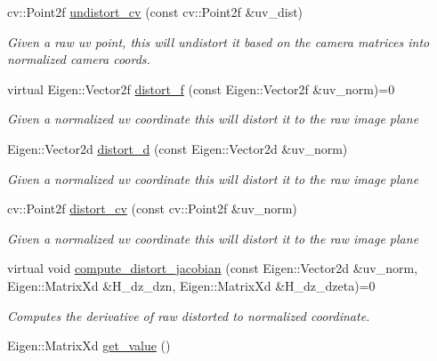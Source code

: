 \begin{DoxyCompactItemize}
cv\+::\+Point2f \hyperlink{classov__core_1_1CamBase_a42b140a7dfc1398cc7fc2f8df6c141d2}{undistort\+\_\+cv} (const cv\+::\+Point2f \&uv\+\_\+dist)
\begin{DoxyCompactList}\small\item\em Given a raw uv point, this will undistort it based on the camera matrices into normalized camera coords. \end{DoxyCompactList}\item 
virtual Eigen\+::\+Vector2f \hyperlink{classov__core_1_1CamBase_a00902793219107474dc21f762fb14556}{distort\+\_\+f} (const Eigen\+::\+Vector2f \&uv\+\_\+norm)=0
\begin{DoxyCompactList}\small\item\em Given a normalized uv coordinate this will distort it to the raw image plane \end{DoxyCompactList}\item 
Eigen\+::\+Vector2d \hyperlink{classov__core_1_1CamBase_acf981dbc008c5929bf32ddde80b04caf}{distort\+\_\+d} (const Eigen\+::\+Vector2d \&uv\+\_\+norm)
\begin{DoxyCompactList}\small\item\em Given a normalized uv coordinate this will distort it to the raw image plane \end{DoxyCompactList}\item 
cv\+::\+Point2f \hyperlink{classov__core_1_1CamBase_ae04e8fb6f5b61a7c9e9b7c22cfc1b82c}{distort\+\_\+cv} (const cv\+::\+Point2f \&uv\+\_\+norm)
\begin{DoxyCompactList}\small\item\em Given a normalized uv coordinate this will distort it to the raw image plane \end{DoxyCompactList}\item 
virtual void \hyperlink{classov__core_1_1CamBase_a498fa2b56be008d7b59bf9927f60d5db}{compute\+\_\+distort\+\_\+jacobian} (const Eigen\+::\+Vector2d \&uv\+\_\+norm, Eigen\+::\+Matrix\+Xd \&H\+\_\+dz\+\_\+dzn, Eigen\+::\+Matrix\+Xd \&H\+\_\+dz\+\_\+dzeta)=0
\begin{DoxyCompactList}\small\item\em Computes the derivative of raw distorted to normalized coordinate. \end{DoxyCompactList}\item 
\mbox{\label{classov__core_1_1CamBase_aa8c2283f7db1a88b590c8058e8949150}} 
Eigen\+::\+Matrix\+Xd \hyperlink{classov__core_1_1CamBase_aa8c2283f7db1a88b590c8058e8949150}{get\+\_\+value} ()

\end{DoxyCompactItemize}
